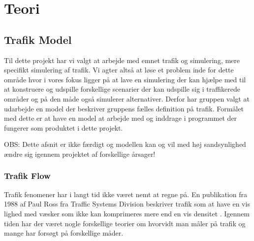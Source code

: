 \chapter{Teori}\label{Teori}

\section{Trafik Model}

Til dette projekt har vi valgt at arbejde med emnet trafik og simulering, mere specifikt simulering af trafik. Vi agter altså at løse et problem inde for dette område hvor i vores fokus ligger på at lave en simulering der kan hjælpe med til at konstruere og udspille forskellige scenarier der kan udspille sig i traffikerede områder og på den måde også simulerer alternativer. Derfor har gruppen valgt at udarbejde en model der beskriver gruppens fælles definition på trafik. Formålet med dette er at have en model at arbejde med og inddrage i programmet der fungerer som produktet i dette projekt.

OBS: Dette afsnit er ikke færdigt og modellen kan og vil med høj sandsynlighed ændre sig igennem projektet af forskellige årsager! 

\subsection{Trafik Flow}

Trafik fenomener har i langt tid ikke været nemt at regne på. En publikation fra 1988 af Paul Ross fra Traffic Systems Division beskriver trafik som at have en vis lighed med væsker som ikke kan komprimeres mere end en vis densitet \cite{trafdyn}. Igennem tiden har der været nogle forskellige teorier om hvorvidt man måler på trafik og mange har forsøgt på forskellige måder. 


